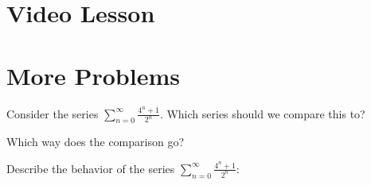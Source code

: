 \documentclass{ximera}
\begin{document}
\section{Video Lesson}

\begin{center}
\begin{foldable}
\end{foldable}
\end{center}


\section{More Problems}


\begin{problem}
Consider the series $\sum_{n=0}^\infty \frac{4^n + 1}{2^n}$.
Which series should we compare this to?

\begin{multipleChoice}
\end{multipleChoice}

Which way does the comparison go?
\begin{multipleChoice}
\end{multipleChoice}

Describe the behavior of the series $\sum_{n=0}^\infty \frac{4^n + 1}{2^n}:$
\begin{multipleChoice}
\end{multipleChoice}

\end{problem}
\end{document}

